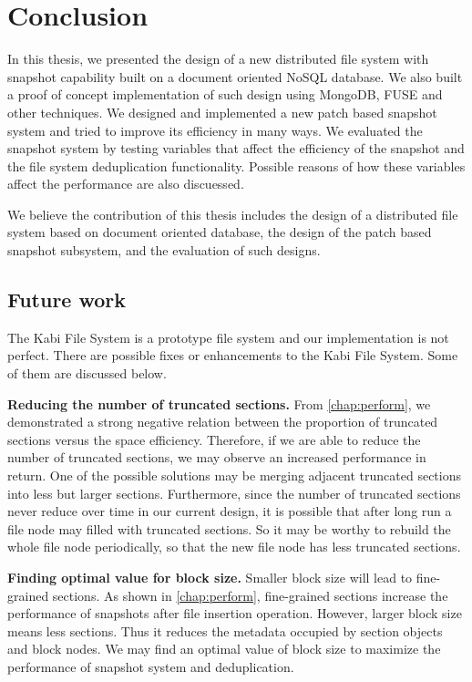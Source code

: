 \chapter{Conclusion}
\label{chap:conclusion}

    In this thesis, we presented the design of a new distributed file system with snapshot capability built on a document oriented NoSQL database. We also built a proof of concept implementation of such design using MongoDB, FUSE and other techniques. We designed and implemented a new patch based snapshot system and tried to improve its efficiency in many ways. We evaluated the snapshot system by testing variables that affect the efficiency of the snapshot and the file system deduplication functionality. Possible reasons of how these variables affect the performance are also discuessed.

    We believe the contribution of this thesis includes the design of a distributed file system based on document oriented database, the design of the patch based snapshot subsystem, and the evaluation of such designs.

\section{Future work}

    The Kabi File System is a prototype file system and our implementation is not perfect. There are possible fixes or enhancements to the Kabi File System. Some of them are discussed below.    

    \textbf{Reducing the number of truncated sections.} From \cref{chap:perform}, we demonstrated a strong negative relation between the proportion of truncated sections versus the space efficiency. Therefore, if we are able to reduce the number of truncated sections, we may observe an increased performance in return. One of the possible solutions may be merging adjacent truncated sections into less but larger sections. Furthermore, since the number of truncated sections never reduce over time in our current design, it is possible that after long run a file node may filled with truncated sections. So it may be worthy to rebuild the whole file node periodically, so that the new file node has less truncated sections.
    
    \textbf{Finding optimal value for block size.} Smaller block size will lead to fine-grained sections. As shown in \cref{chap:perform}, fine-grained sections increase the performance of snapshots after file insertion operation. However, larger block size means less sections. Thus it reduces the metadata occupied by section objects and block nodes. We may find an optimal value of block size to maximize the performance of snapshot system and deduplication.

